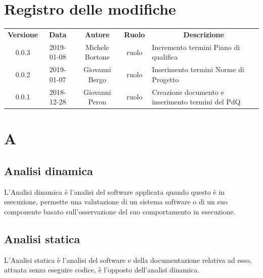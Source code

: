 \documentclass[11pt,a4paper]{article}
\begin{document}
	
	\newpage
	\section*{\centering Registro delle modifiche}
	\begin{tabularx}{\textwidth}{ c | c | c | c | X }
		\rowcolor{LightBlue}
		\color{white}\bfseries Versione & \color{white}\bfseries Data & \color{white}\bfseries Autore & \color{white}\bfseries Ruolo & \multicolumn{1}{c}{\color{white}\bfseries Descrizione}\\[0.25cm]
		0.0.3 & 2019-01-08 & Michele Bortone & ruolo & Incremento termini Piano di qualifica \\ 
		\hline 
		0.0.2 & 2019-01-07 & Giovanni Bergo & ruolo & Inserimento termini Norme di Progetto \\ 
		\hline 
		0.0.1 & 2018-12-28 & Giovanni Peron & ruolo & Creazione documento e \newline inserimento termini del PdQ \\ 
		\hline
	
	\end{tabularx}
	\newpage
	\setcounter{secnumdepth}{0}
	\tableofcontents
	\newpage
	\section{A}
	\subsection{Analisi dinamica}
		L'Analisi dinamica è l'analisi del software applicata quando questo è in esecuzione, permette una valutazione di un sistema software o di un suo componente basato sull’osservazione del suo comportamento in esecuzione.
	
	\subsection{Analisi statica}
L'Analisi statica è l'analisi del software e della documentazione relativa ad esso, attuata senza eseguire codice, è l'opposto dell'analisi dinamica.
\end{document}
